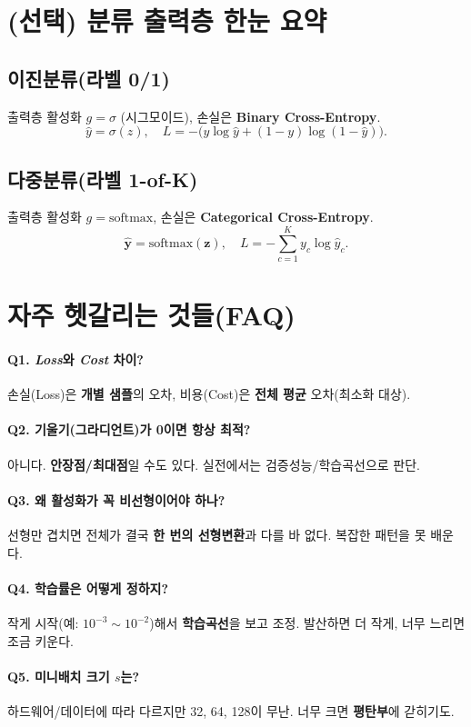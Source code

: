 \documentclass[12pt]{article}
\begin{document}
\section{(선택) 분류 출력층 한눈 요약}
\subsection*{이진분류(라벨 0/1)}
출력층 활성화 \(g=\sigma\) (시그모이드), 손실은 \textbf{Binary Cross-Entropy}.
\[
\hat{y}=\sigma(z),\quad
L=-\big(y\log \hat{y} + (1-y)\log(1-\hat{y})\big).
\]
\subsection*{다중분류(라벨 1-of-K)}
출력층 활성화 \(g=\text{softmax}\), 손실은 \textbf{Categorical Cross-Entropy}.
\[
\hat{\mathbf{y}}=\text{softmax}(\mathbf{z}),\quad
L=-\sum_{c=1}^{K} y_c\log \hat{y}_c.
\]

\section{자주 헷갈리는 것들(FAQ)}
\paragraph{Q1. \textit{Loss}와 \textit{Cost} 차이?}
손실(Loss)은 \textbf{개별 샘플}의 오차, 비용(Cost)은 \textbf{전체 평균} 오차(최소화 대상).

\paragraph{Q2. 기울기(그라디언트)가 0이면 항상 최적?}
아니다. \textbf{안장점/최대점}일 수도 있다. 실전에서는 검증성능/학습곡선으로 판단.

\paragraph{Q3. 왜 활성화가 꼭 비선형이어야 하나?}
선형만 겹치면 전체가 결국 \textbf{한 번의 선형변환}과 다를 바 없다. 복잡한 패턴을 못 배운다.

\paragraph{Q4. 학습률은 어떻게 정하지?}
작게 시작(예: $10^{-3}\sim 10^{-2}$)해서 \textbf{학습곡선}을 보고 조정. 발산하면 더 작게, 너무 느리면 조금 키운다.

\paragraph{Q5. 미니배치 크기 $s$는?}
하드웨어/데이터에 따라 다르지만 32, 64, 128이 무난. 너무 크면 \textbf{평탄부}에 갇히기도.
\end{document}
